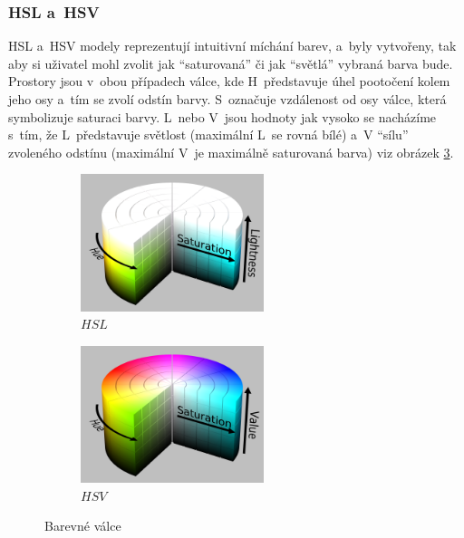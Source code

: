 \documentclass[11pt, a4paper, titlepage]{article}
\renewcommand{\uv}[1]{``#1''}
\begin{document}
\subsubsection{HSL a~HSV} \label{hsv/hsl}
HSL a~HSV modely reprezentují intuitivní míchání barev, a~byly vytvořeny, tak aby si uživatel mohl zvolit jak \uv{saturovaná} či jak \uv{světlá} vybraná barva bude.
Prostory jsou v~obou případech válce, kde H~představuje úhel pootočení kolem jeho osy a~tím se zvolí odstín barvy.
S~označuje vzdálenost od osy válce, která symbolizuje saturaci barvy.
L~nebo V~jsou hodnoty jak vysoko se nacházíme s~tím, že L~představuje světlost (maximální L~se rovná bílé) a~V \uv{sílu} zvoleného odstínu (maximální V~je maximálně saturovaná barva) viz obrázek \ref{fig:hsv_hsl}.
\begin{figure}[h]
    \centering
    \begin{subfigure}[b]{0.3\textwidth}
        \includegraphics[height=4cm]{HSL.png}
        \caption{$HSL$}
        \label{fig:hsv_hsl:hsl}
    \end{subfigure}
    \hspace{0.2cm}
    \begin{subfigure}[b]{0.3\textwidth}
        \includegraphics[height=4cm]{HSV.png}
        \caption{$HSV$}
        \label{fig:hsv_hsl:hsv}
    \end{subfigure}
    
    \caption{Barevné válce \cite{wiki:HSL_and_HSV}}
    
    \label{fig:hsv_hsl}
\end{figure}
\end{document}

